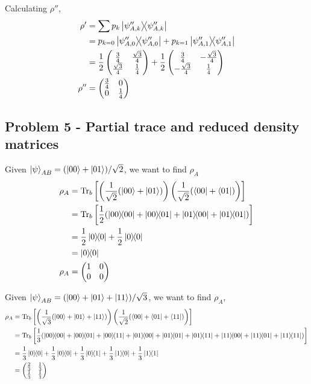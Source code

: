 Calculating $\rho''$,
\begin{align}
    \rho' &= \sum p_k \ketbra{\psi''_{A,k}} \\ 
    &= p_{k=0}\ketbra{\psi''_{A,0}} + p_{k=1}\ketbra{\psi''_{A,1}} \\
    &= \frac{1}{2}\begin{pmatrix}\frac{3}{4} & \frac{\sqrt{3}}{4} \\ \frac{\sqrt{3}}{4} & \frac{1}{4}\end{pmatrix} + \frac{1}{2}\begin{pmatrix}\frac{3}{4} & -\frac{\sqrt{3}}{4} \\ -\frac{\sqrt{3}}{4} & \frac{1}{4}\end{pmatrix} \\
    \rho'' &= \begin{pmatrix}\frac{3}{4} & 0 \\ 0 & \frac{1}{4}\end{pmatrix}
\end{align} 



\newpage
\subsection{Problem 5 - Partial trace and reduced density matrices}
Given $\ket{\psi}_{AB} = (\ket{00} + \ket{01})/\sqrt{2}$, we want to find $\rho_A$
\begin{align}
    \rho_A &= \Tr_b\left[\left(\frac{1}{\sqrt{2}}(\ket{00} + \ket{01})\right)\left(\frac{1}{\sqrt{2}}(\bra{00} + \bra{01})\right)\right] \\
    &= \Tr_b\left[\frac{1}{2}(\ketbra{00} + \ketbra{00}{01} + \ketbra{01}{00} + \ketbra{01}{01})\right] \\
    &= \frac{1}{2}\ketbra{0} + \frac{1}{2}\ketbra{0} \\ 
    &= \ketbra{0} \\ 
    \rho_A &= \begin{pmatrix}1 & 0 \\ 0 & 0\end{pmatrix}
\end{align}

Given $\ket{\psi}_{AB} = (\ket{00} + \ket{01} + \ket{11})/\sqrt{3}$, we want to find $\rho_A$,
\begin{align}
    \rho_A &= \Tr_b\left[\left(\frac{1}{\sqrt{3}}(\ket{00} + \ket{01} + \ket{11})\right)\left(\frac{1}{\sqrt{2}}(\bra{00} + \bra{01} + \bra{11})\right)\right] \\
    &= \Tr_b\left[\frac{1}{3}(\ketbra{00}{00} + \ketbra{00}{01} + \ketbra{00}{11} + \ketbra{01}{00} + \ketbra{01}{01} + \ketbra{01}{11} + \ketbra{11}{00} + \ketbra{11}{01} + \ketbra{11}{11})\right] \\
    &= \frac{1}{3}\ketbra{0}{0} + \frac{1}{3}\ketbra{0}{0} + \frac{1}{3}\ketbra{0}{1} + \frac{1}{3}\ketbra{1}{0} +  \frac{1}{3}\ketbra{1}{1} \\
    &= \begin{pmatrix}\frac{2}{3} & \frac{1}{3} \\ \frac{1}{3} & \frac{1}{3}\end{pmatrix}
\end{align}



